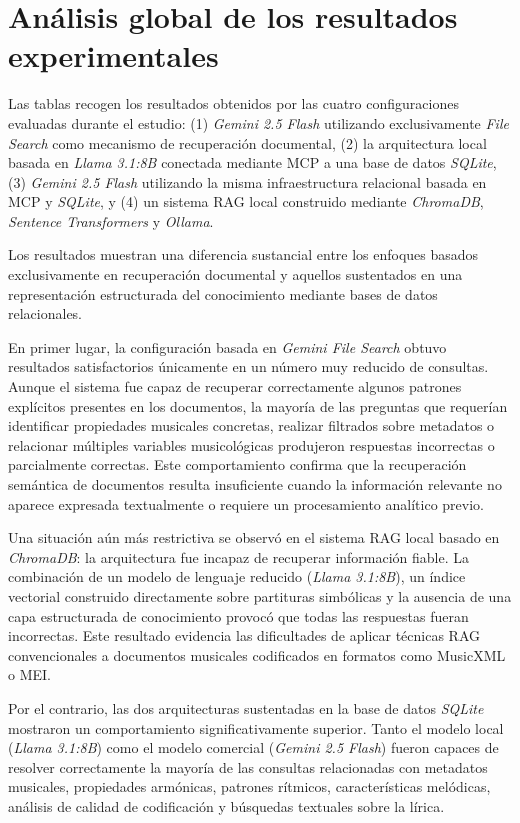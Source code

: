 \section{Análisis global de los resultados experimentales}

Las tablas recogen los resultados obtenidos por las cuatro configuraciones evaluadas durante el estudio: (1) \textit{Gemini 2.5 Flash} utilizando exclusivamente \textit{File Search} como mecanismo de recuperación documental, (2) la arquitectura local basada en \textit{Llama 3.1:8B} conectada mediante MCP a una base de datos \textit{SQLite}, (3) \textit{Gemini 2.5 Flash} utilizando la misma infraestructura relacional basada en MCP y \textit{SQLite}, y (4) un sistema RAG local construido mediante \textit{ChromaDB}, \textit{Sentence Transformers} y \textit{Ollama}.

Los resultados muestran una diferencia sustancial entre los enfoques basados exclusivamente en recuperación documental y aquellos sustentados en una representación estructurada del conocimiento mediante bases de datos relacionales.

En primer lugar, la configuración basada en \textit{Gemini File Search} obtuvo resultados satisfactorios únicamente en un número muy reducido de consultas. Aunque el sistema fue capaz de recuperar correctamente algunos patrones explícitos presentes en los documentos, la mayoría de las preguntas que requerían identificar propiedades musicales concretas, realizar filtrados sobre metadatos o relacionar múltiples variables musicológicas produjeron respuestas incorrectas o parcialmente correctas. Este comportamiento confirma que la recuperación semántica de documentos resulta insuficiente cuando la información relevante no aparece expresada textualmente o requiere un procesamiento analítico previo.

Una situación aún más restrictiva se observó en el sistema RAG local basado en \textit{ChromaDB}: la arquitectura fue incapaz de recuperar información fiable. La combinación de un modelo de lenguaje reducido (\textit{Llama 3.1:8B}), un índice vectorial construido directamente sobre partituras simbólicas y la ausencia de una capa estructurada de conocimiento provocó que todas las respuestas fueran incorrectas. Este resultado evidencia las dificultades de aplicar técnicas RAG convencionales a documentos musicales codificados en formatos como MusicXML o MEI.

Por el contrario, las dos arquitecturas sustentadas en la base de datos \textit{SQLite} mostraron un comportamiento significativamente superior. Tanto el modelo local (\textit{Llama 3.1:8B}) como el modelo comercial (\textit{Gemini 2.5 Flash}) fueron capaces de resolver correctamente la mayoría de las consultas relacionadas con metadatos musicales, propiedades armónicas, patrones rítmicos, características melódicas, análisis de calidad de codificación y búsquedas textuales sobre la lírica.


